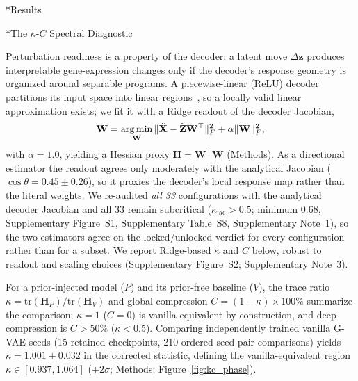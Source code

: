 \documentclass[11pt,a4paper]{article}
\makeatletter
\renewcommand{\section}{\@startsection{section}{1}{0pt}{12pt plus 6pt}{6pt}{\large\bfseries}}
\renewcommand{\subsection}{\@startsection{subsection}{2}{0pt}{10pt plus 4pt}{4pt}{\normalsize\bfseries}}
\newcommand{\Hmat}{\mathbf{H}}\newcommand{\Wmat}{\mathbf{W}}\newcommand{\Jmat}{\mathbf{J}}
\makeatother
\begin{document}
\section*{Results}

\subsection*{The $\kappa$-$C$ Spectral Diagnostic}

Perturbation readiness is a property of the decoder: a latent move $\Delta\mathbf{z}$ produces interpretable gene-expression changes only if the decoder's response geometry is organized around separable programs. A piecewise-linear (ReLU) decoder partitions its input space into linear regions~\cite{montufar2014}, so a locally valid linear approximation exists; we fit it with a Ridge readout of the decoder Jacobian,
\begin{equation}
\Wmat = \argmin_{\mathbf{W}} \|\tilde{\Xmat} - \tilde{\Zmat}\Wmat^\top\|_F^2 + \alpha\|\Wmat\|_F^2,
\label{eq:ridge}
\end{equation}
with $\alpha=1.0$, yielding a Hessian proxy $\Hmat = \Wmat^\top\Wmat$ (Methods). As a directional estimator the readout agrees only moderately with the analytical Jacobian ($\cos\theta=0.45\pm0.26$), so it proxies the decoder's local response map rather than the literal weights. We re-audited \emph{all 33} configurations with the analytical decoder Jacobian and all 33 remain subcritical ($\kappa_{\mathrm{jac}}>0.5$; minimum $0.68$, Supplementary Figure~S1, Supplementary Table~S8, Supplementary Note~1), so the two estimators agree on the locked/unlocked verdict for every configuration rather than for a subset. We report Ridge-based $\kappa$ and $C$ below, robust to readout and scaling choices (Supplementary Figure~S2; Supplementary Note~3).

For a prior-injected model ($P$) and its prior-free baseline ($V$), the trace ratio $\kappa=\mathrm{tr}(\Hmat_P)/\mathrm{tr}(\Hmat_V)$ and global compression $C=(1-\kappa)\times100\%$ summarize the comparison; $\kappa=1$ ($C=0$) is vanilla-equivalent by construction, and deep compression is $C>50\%$ ($\kappa<0.5$). Comparing independently trained vanilla G-VAE seeds (15 retained checkpoints, 210 ordered seed-pair comparisons) yields $\kappa=1.001\pm0.032$ in the corrected statistic, defining the vanilla-equivalent region $\kappa\in[0.937,1.064]$ ($\pm2\sigma$; Methods; Figure~\ref{fig:kc_phase}).
\end{document}
